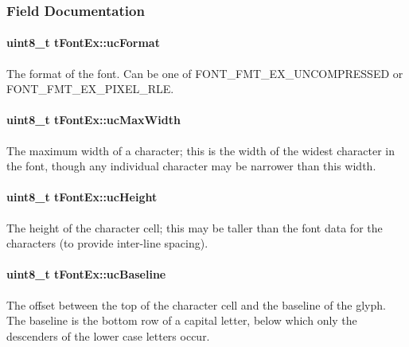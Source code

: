\subsubsection{Field Documentation}
\paragraph[{uc\+Format}]{\setlength{\rightskip}{0pt plus 5cm}uint8\+\_\+t t\+Font\+Ex\+::uc\+Format}\label{structt_font_ex_a18d1466a68cd5673de8290372edf390e}
The format of the font. Can be one of F\+O\+N\+T\+\_\+\+F\+M\+T\+\_\+\+E\+X\+\_\+\+U\+N\+C\+O\+M\+P\+R\+E\+S\+S\+E\+D or F\+O\+N\+T\+\_\+\+F\+M\+T\+\_\+\+E\+X\+\_\+\+P\+I\+X\+E\+L\+\_\+\+R\+L\+E. 
\paragraph[{uc\+Max\+Width}]{\setlength{\rightskip}{0pt plus 5cm}uint8\+\_\+t t\+Font\+Ex\+::uc\+Max\+Width}\label{structt_font_ex_a3f51fb84bffa3931869ea672dc6c52d1}
The maximum width of a character; this is the width of the widest character in the font, though any individual character may be narrower than this width. 
\paragraph[{uc\+Height}]{\setlength{\rightskip}{0pt plus 5cm}uint8\+\_\+t t\+Font\+Ex\+::uc\+Height}\label{structt_font_ex_a8baf5550b51a3d163c7ebd9dbff45ed0}
The height of the character cell; this may be taller than the font data for the characters (to provide inter-\/line spacing). 
\paragraph[{uc\+Baseline}]{\setlength{\rightskip}{0pt plus 5cm}uint8\+\_\+t t\+Font\+Ex\+::uc\+Baseline}\label{structt_font_ex_a27e75a2228f0a32014b459eef7c34d3f}
The offset between the top of the character cell and the baseline of the glyph. The baseline is the bottom row of a capital letter, below which only the descenders of the lower case letters occur. 
